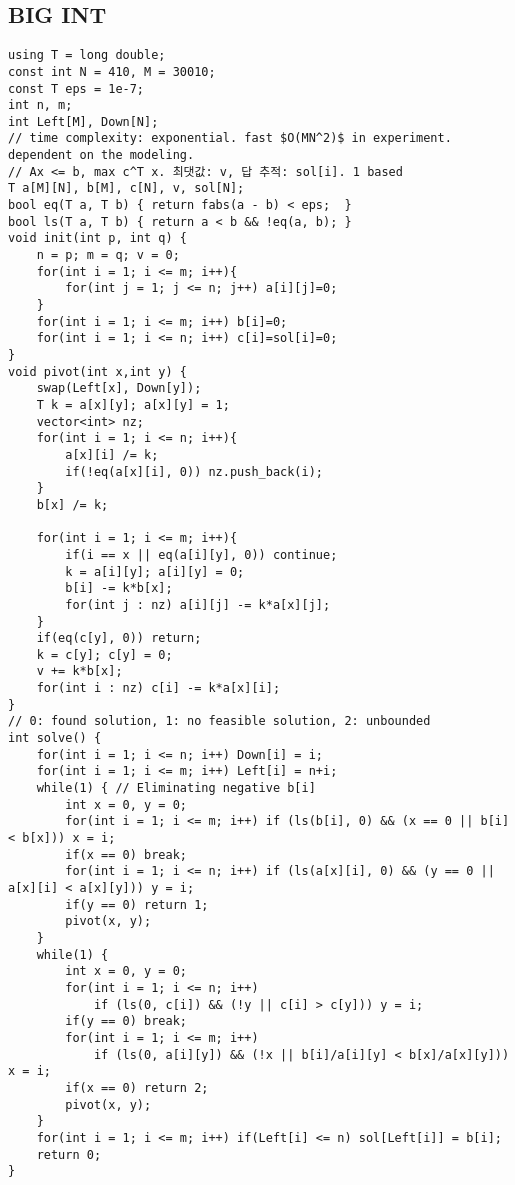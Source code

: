\documentclass[landscape, 8pt, a4paper, oneside, twocolumn]{extarticle}
\begin{document}
\subsection{BIG INT}
\begin{verbatim}
using T = long double;
const int N = 410, M = 30010;
const T eps = 1e-7;
int n, m;
int Left[M], Down[N];
// time complexity: exponential. fast $O(MN^2)$ in experiment. dependent on the modeling.
// Ax <= b, max c^T x. 최댓값: v, 답 추적: sol[i]. 1 based
T a[M][N], b[M], c[N], v, sol[N];
bool eq(T a, T b) { return fabs(a - b) < eps;  }
bool ls(T a, T b) { return a < b && !eq(a, b); }
void init(int p, int q) {
	n = p; m = q; v = 0;
	for(int i = 1; i <= m; i++){
		for(int j = 1; j <= n; j++) a[i][j]=0;
	}
	for(int i = 1; i <= m; i++) b[i]=0;
	for(int i = 1; i <= n; i++) c[i]=sol[i]=0;
}
void pivot(int x,int y) {
	swap(Left[x], Down[y]);
	T k = a[x][y]; a[x][y] = 1;
	vector<int> nz;
	for(int i = 1; i <= n; i++){
		a[x][i] /= k;
		if(!eq(a[x][i], 0)) nz.push_back(i);
	}
	b[x] /= k;

	for(int i = 1; i <= m; i++){
		if(i == x || eq(a[i][y], 0)) continue;
		k = a[i][y]; a[i][y] = 0;
		b[i] -= k*b[x];
		for(int j : nz) a[i][j] -= k*a[x][j];
	}
	if(eq(c[y], 0)) return;
	k = c[y]; c[y] = 0;
	v += k*b[x];
	for(int i : nz) c[i] -= k*a[x][i];
}
// 0: found solution, 1: no feasible solution, 2: unbounded
int solve() {
	for(int i = 1; i <= n; i++) Down[i] = i;
	for(int i = 1; i <= m; i++) Left[i] = n+i;
	while(1) { // Eliminating negative b[i]
		int x = 0, y = 0;
		for(int i = 1; i <= m; i++) if (ls(b[i], 0) && (x == 0 || b[i] < b[x])) x = i;
		if(x == 0) break;
		for(int i = 1; i <= n; i++) if (ls(a[x][i], 0) && (y == 0 || a[x][i] < a[x][y])) y = i;
		if(y == 0) return 1;
		pivot(x, y);
	}
	while(1) {
		int x = 0, y = 0;
		for(int i = 1; i <= n; i++)
			if (ls(0, c[i]) && (!y || c[i] > c[y])) y = i;
		if(y == 0) break;
		for(int i = 1; i <= m; i++)
			if (ls(0, a[i][y]) && (!x || b[i]/a[i][y] < b[x]/a[x][y])) x = i;
		if(x == 0) return 2;
		pivot(x, y);
	}
	for(int i = 1; i <= m; i++) if(Left[i] <= n) sol[Left[i]] = b[i];
	return 0;
}
\end{verbatim}
\end{document}
